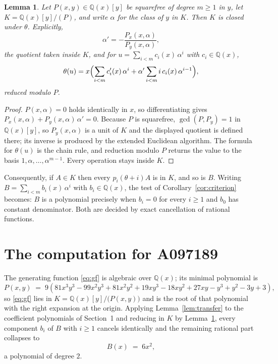 \documentclass[11pt,a4paper]{article}
\theoremstyle{plain}
\newtheorem{lemma}[theorem]{Lemma}
\theoremstyle{definition}
\begin{document}
\begin{lemma}\label{lem:field}
Let $P(x,y)\in\mathbb{Q}(x)[y]$ be squarefree of degree $m\ge1$ in $y$, let
$K=\mathbb{Q}(x)[y]/(P)$, and write $\alpha$ for the class of $y$ in $K$. Then $K$ is
closed under $\theta$. Explicitly,
\[
\alpha'=-\frac{P_{x}(x,\alpha)}{P_{y}(x,\alpha)},
\]
the quotient taken inside $K$, and for $u=\sum_{i<m}c_{i}(x)\,\alpha^{i}$ with
$c_{i}\in\mathbb{Q}(x)$,
\[
\theta(u)=x\Bigl(\sum_{i<m}c_{i}'(x)\,\alpha^{i}
 +\alpha'\sum_{i<m}i\,c_{i}(x)\,\alpha^{i-1}\Bigr),
\]
reduced modulo $P$.
\end{lemma}

\begin{proof}
$P(x,\alpha)=0$ holds identically in $x$, so differentiating gives
$P_{x}(x,\alpha)+P_{y}(x,\alpha)\,\alpha'=0$. Because $P$ is squarefree,
$\gcd(P,P_{y})=1$ in $\mathbb{Q}(x)[y]$, so $P_{y}(x,\alpha)$ is a unit of $K$ and the
displayed quotient is defined there; its inverse is produced by the extended Euclidean
algorithm. The formula for $\theta(u)$ is the chain rule, and reduction modulo $P$ returns
the value to the basis $1,\alpha,\dots,\alpha^{m-1}$. Every operation stays inside $K$.
\end{proof}

Consequently, if $A\in K$ then every $p_{i}(\theta+i)A$ is in $K$, and so is $B$. Writing
$B=\sum_{i<m}b_{i}(x)\,\alpha^{i}$ with $b_{i}\in\mathbb{Q}(x)$, the test of
Corollary~\ref{cor:criterion} becomes: $B$ is a polynomial precisely when $b_{i}=0$ for
every $i\ge1$ and $b_{0}$ has constant denominator. Both are decided by exact
cancellation of rational functions.

\section{The computation for A097189}

The generating function \eqref{eq:gf} is algebraic over $\mathbb{Q}(x)$;
its minimal polynomial is
\[
P(x,y) \;=\; 9 \left(81 x^{3} y^{3} - 99 x^{2} y^{3} + 81 x^{2} y^{2} + 19 x y^{3} - 18 x y^{2} + 27 x y - y^{3} + y^{2} - 3 y + 3\right) ,
\]
so \eqref{eq:gf} lies in $K=\mathbb{Q}(x)[y]/\bigl(P(x,y)\bigr)$ and is the root of that polynomial with the right
expansion at the origin. Applying Lemma~\ref{lem:transfer} to the coefficient polynomials
of Section~1 and reducing in $K$ by Lemma~\ref{lem:field}, every component $b_{i}$ of $B$
with $i\ge1$ cancels identically and the remaining rational part collapses to
\[
B(x)\;=\;6 x^{2} ,
\]
a polynomial of degree $2$.
\end{document}
